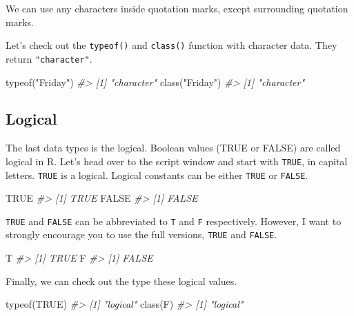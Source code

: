 \documentclass[
]{book}
\newenvironment{Shaded}{\begin{snugshade}}{\end{snugshade}}
\newcommand{\CommentTok}[1]{\textcolor[rgb]{0.56,0.35,0.01}{\textit{#1}}}
\newcommand{\ConstantTok}[1]{\textcolor[rgb]{0.00,0.00,0.00}{#1}}
\newcommand{\FunctionTok}[1]{\textcolor[rgb]{0.00,0.00,0.00}{#1}}
\newcommand{\NormalTok}[1]{#1}
\newcommand{\StringTok}[1]{\textcolor[rgb]{0.31,0.60,0.02}{#1}}
\begin{document}
We can use any characters inside quotation marks, except surrounding quotation marks.

Let's check out the \texttt{typeof()} and \texttt{class()} function with character data. They return \texttt{"character"}.

\begin{Shaded}
\begin{Highlighting}[]
\FunctionTok{typeof}\NormalTok{(}\StringTok{"Friday"}\NormalTok{)}
\CommentTok{\#\textgreater{} [1] "character"}
\FunctionTok{class}\NormalTok{(}\StringTok{"Friday"}\NormalTok{)}
\CommentTok{\#\textgreater{} [1] "character"}
\end{Highlighting}
\end{Shaded}

\hypertarget{logical}{%
\subsection{Logical}\label{logical}}

The last data types is the logical. Boolean values (TRUE or FALSE) are called logical in R. Let's head over to the script window and start with \texttt{TRUE}, in capital letters. \texttt{TRUE} is a logical. Logical constants can be either \texttt{TRUE} or \texttt{FALSE}.

\begin{Shaded}
\begin{Highlighting}[]
\ConstantTok{TRUE}
\CommentTok{\#\textgreater{} [1] TRUE}
\ConstantTok{FALSE}
\CommentTok{\#\textgreater{} [1] FALSE}
\end{Highlighting}
\end{Shaded}

\texttt{TRUE} and \texttt{FALSE} can be abbreviated to \texttt{T} and \texttt{F} respectively. However, I want to strongly encourage you to use the full versions, \texttt{TRUE} and \texttt{FALSE}.

\begin{Shaded}
\begin{Highlighting}[]
\NormalTok{T}
\CommentTok{\#\textgreater{} [1] TRUE}
\NormalTok{F}
\CommentTok{\#\textgreater{} [1] FALSE}
\end{Highlighting}
\end{Shaded}

Finally, we can check out the type these logical values.

\begin{Shaded}
\begin{Highlighting}[]
\FunctionTok{typeof}\NormalTok{(}\ConstantTok{TRUE}\NormalTok{)}
\CommentTok{\#\textgreater{} [1] "logical"}
\FunctionTok{class}\NormalTok{(F)}
\CommentTok{\#\textgreater{} [1] "logical"}
\end{Highlighting}
\end{Shaded}
\end{document}
